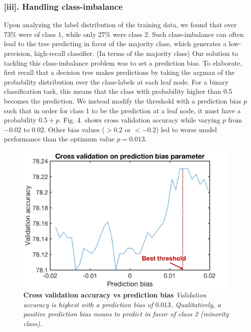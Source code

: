 \subsubsection*{[iii]. Handling class-imbalance}
Upon analyzing the label distribution of the training data, we found that over $73\%$ were of class $1$, while only $27\%$ were class 2. Such class-imbalance can often lead to the tree predicting in favor of the majority class, which generates a low-precision, high-recall classifier. (In terms of the majority class) Our solution to tackling this class-imbalance problem was to set a prediction bias. To elaborate, first recall that a decision tree makes predictions by taking the argmax of the probability distribution over the class-labels at each leaf node. For a binary classification task, this means that the class with probability higher than 0.5 becomes the prediction. We instead modify the threshold with a prediction bias $p$ such that in order for class 1 to be the prediction at a leaf node, it must have a probability $0.5 + p$. Fig. 4. shows cross validation accuracy while varying $p$ from $-0.02$ to $0.02$. Other bias values ($> 0.2$ or $< -0.2$) led to worse model performance than the optimum value $p = 0.013$. 
\begin{figure}[h]
\center
\includegraphics[scale=0.5]{figure4/figure4.png}
\caption{\textbf{Cross validation accuracy vs prediction bias} \textit{Validation accuracy is highest with a prediction bias of $0.013$. Qualitatively, a positive prediction bias means to predict in favor of class 2 (minority class). }}
\end{figure}

